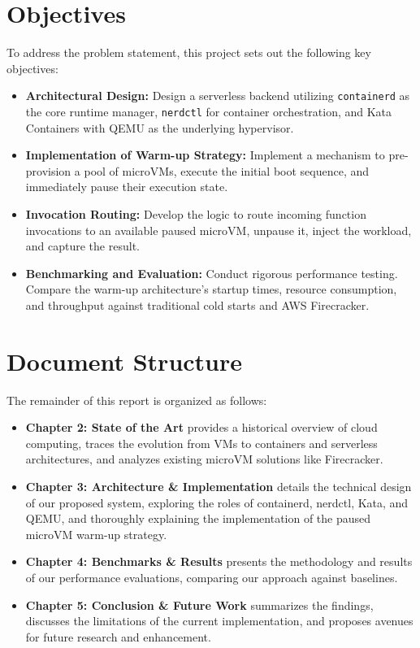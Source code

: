 \section{Objectives}
To address the problem statement, this project sets out the following key objectives:
\begin{itemize}
    \item \textbf{Architectural Design:} Design a serverless backend utilizing \texttt{containerd} as the core runtime manager, \texttt{nerdctl} for container orchestration, and Kata Containers with QEMU as the underlying hypervisor.
    \item \textbf{Implementation of Warm-up Strategy:} Implement a mechanism to pre-provision a pool of microVMs, execute the initial boot sequence, and immediately pause their execution state.
    \item \textbf{Invocation Routing:} Develop the logic to route incoming function invocations to an available paused microVM, unpause it, inject the workload, and capture the result.
    \item \textbf{Benchmarking and Evaluation:} Conduct rigorous performance testing. Compare the warm-up architecture's startup times, resource consumption, and throughput against traditional cold starts and AWS Firecracker.
\end{itemize}

\section{Document Structure}
The remainder of this report is organized as follows:
\begin{itemize}
    \item \textbf{Chapter 2: State of the Art} provides a historical overview of cloud computing, traces the evolution from VMs to containers and serverless architectures, and analyzes existing microVM solutions like Firecracker.
    \item \textbf{Chapter 3: Architecture \& Implementation} details the technical design of our proposed system, exploring the roles of containerd, nerdctl, Kata, and QEMU, and thoroughly explaining the implementation of the paused microVM warm-up strategy.
    \item \textbf{Chapter 4: Benchmarks \& Results} presents the methodology and results of our performance evaluations, comparing our approach against baselines.
    \item \textbf{Chapter 5: Conclusion \& Future Work} summarizes the findings, discusses the limitations of the current implementation, and proposes avenues for future research and enhancement.
\end{itemize}

\vspace{5cm} %
\lipsum[1-20] %

